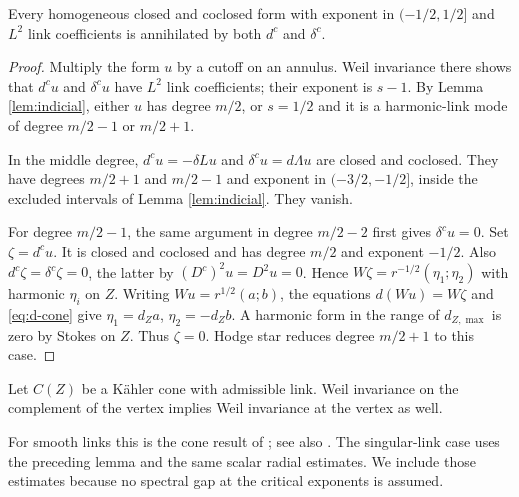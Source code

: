 \begin{lemma}\label{prop:slow}
Every homogeneous closed and coclosed form with exponent in
$(-1/2,1/2]$ and $L^2$ link coefficients is annihilated by both
$d^c$ and $\delta^c$.
\end{lemma}
\begin{proof}
Multiply the form $u$ by a cutoff on an annulus. Weil invariance
there shows that $d^cu$ and $\delta^cu$ have $L^2$ link
coefficients; their exponent is $s-1$.
By Lemma \ref{lem:indicial}, either $u$ has degree $m/2$, or
$s=1/2$ and it is a harmonic-link mode of degree $m/2-1$ or
$m/2+1$.

In the middle degree, $d^cu=-\delta Lu$ and
$\delta^cu=d\Lambda u$ are closed and coclosed. They have
degrees $m/2+1$ and $m/2-1$ and exponent in $(-3/2,-1/2]$,
inside the excluded intervals of Lemma \ref{lem:indicial}.
They vanish.

For degree $m/2-1$, the same argument in degree $m/2-2$ first
gives $\delta^cu=0$. Set $\zeta=d^cu$. It is closed and
coclosed and has degree $m/2$ and exponent $-1/2$. Also
$d^c\zeta=\delta^c\zeta=0$, the latter by
$(D^c)^2u=D^2u=0$. Hence
$W\zeta=r^{-1/2}(\eta_1;\eta_2)$ with harmonic $\eta_i$ on $Z$.
Writing $Wu=r^{1/2}(a;b)$, the equations
$d(Wu)=W\zeta$ and \eqref{eq:d-cone} give
$\eta_1=d_Za$, $\eta_2=-d_Zb$. A harmonic form in the range
of $d_{Z,\max}$ is zero by Stokes on $Z$. Thus $\zeta=0$.
Hodge star reduces degree $m/2+1$ to this case.
\end{proof}

\begin{theorem}\label{thm:vertex}
Let $C(Z)$ be a K\"ahler cone with admissible link. Weil invariance
on the complement of the vertex implies Weil invariance at the
vertex as well.
\end{theorem}

For smooth links this is the cone result of
\cite[Theorem~2.1]{cheeger83}; see also
\cite[Theorems~3.7 and~5.9]{brl93}. The singular-link case uses
the preceding lemma and the same scalar radial estimates.
We include those estimates because no spectral gap at the critical
exponents is assumed.

